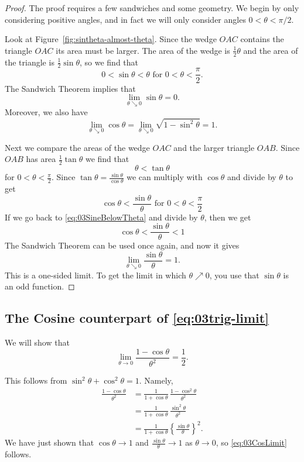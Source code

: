 \begin{proof}
  The proof requires a few sandwiches and some geometry.  We begin by
  only considering positive angles, and in fact we will only consider
  angles $0<\theta<\pi/2$.

  Look at Figure~\ref{fig:sintheta-almost-theta}.   Since the wedge
  $OAC$ contains the triangle $OAC$ its area must be larger.  The area
  of the wedge is $\frac12\theta$ and the area of the triangle is
  $\frac12\sin \theta$, so we find that
  \begin{equation}\label{eq:03SineBelowTheta}
    0<\sin \theta <\theta \text{ for } 0<\theta<\frac\pi2.
  \end{equation}
  The Sandwich Theorem implies that
  \begin{equation}\label{eq:03limSineisZero}
    \lim_{\theta\searrow 0}\sin\theta = 0.
  \end{equation}
  Moreover, we also have
  \begin{equation}\label{eq:03limCosisOne}
    \lim_{\theta\searrow0}\cos\theta =
    \lim_{\theta\searrow0}\sqrt{1-\sin^2\theta} = 1.
  \end{equation}

  Next we compare the areas of the wedge $OAC$ and the larger triangle
  $OAB$.  Since $OAB$ has area $\frac12\tan \theta$ we find that
  \[
  \theta<\tan\theta
  \]
  for $0<\theta<\frac\pi2$.  Since $\tan\theta =
  \frac{\sin\theta}{\cos\theta}$ we can multiply with $\cos\theta$ and
  divide by $\theta$ to get
  \[
  \cos\theta < \frac{\sin\theta}{\theta} \text{ for }0<\theta<\frac\pi2
  \]
  If we go back to \eqref{eq:03SineBelowTheta} and divide by $\theta$, then we
  get
  \[
  \cos\theta < \frac{\sin\theta}{\theta} < 1
  \]
  The Sandwich Theorem can be used once again, and now it gives
  \[
  \lim_{\theta\searrow0} \frac{\sin\theta}\theta = 1.
  \]
  This is a one-sided limit.  To get the limit in which $\theta\nearrow 0$,
  you use that $\sin\theta$ is an odd function.
\end{proof}

\subsection{The Cosine counterpart of \eqref{eq:03trig-limit}}
We will show that
\begin{equation}
  \lim_{\theta\to 0}\frac{1-\cos\theta}{\theta^2} = \frac12.
  \label{eq:03CosLimit}
\end{equation}

This follows from $\sin^2\theta+\cos^2\theta=1$.  Namely,
\begin{align*}
  \frac{1-\cos\theta}{\theta^2}
  &= \frac1{1+\cos\theta}\,\frac{1-\cos^2\theta}{\theta^2} \\
  &= \frac1{1+\cos\theta}\,\frac{\sin^2\theta}{\theta^2} \\
  &= \frac1{1+\cos\theta}\left\{ \frac{\sin\theta}{\theta} \right\}^2.
\end{align*}
We have just shown that $\cos\theta\to1$ and $\frac{\sin\theta}\theta \to
1$ as $\theta\to0$, so \eqref{eq:03CosLimit} follows.

